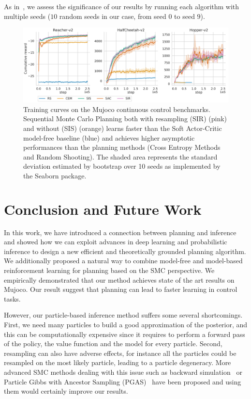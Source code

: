 As in~\citet{henderson2017deep}, we assess the significance of our results by running each algorithm with multiple seeds ($10$ random seeds in our case, from seed $0$ to seed $9$). %






\begin{figure}
\centering
\includegraphics[width=\linewidth]{articles/smcp/figures/finalplotsmcp.pdf}
\caption{
Training curves on the Mujoco continuous control benchmarks. Sequential Monte Carlo Planning both with resampling (SIR) (pink) and without (SIS) (orange) learns faster than the Soft Actor-Critic model-free baseline (blue) and achieves higher asymptotic performances than the planning methods (Cross Entropy Methods and Random Shooting). The shaded area represents the standard deviation estimated by bootstrap over 10 seeds as implemented by the Seaborn package.  %
}
\label{fig:reward_new}
\end{figure}









\section{Conclusion and Future Work}
In this work, we have introduced a connection between planning and inference and showed how we can exploit advances in deep learning and probabilistic inference to design a new efficient and theoretically grounded planning algorithm. 
We additionally proposed a natural way to combine model-free and model-based reinforcement learning for planning based on the SMC perspective.
We empirically demonstrated that our method achieves state of the art results on Mujoco. Our result suggest that planning can lead to faster learning in control tasks.

However, our particle-based inference method suffers some several shortcomings. First, we need many particles to build a good approximation of the posterior, and this can be computationally expensive since it requires to perform a forward pass of the policy, the value function and the model for every particle. Second, resampling can also have adverse effects, for instance all the particles could be resampled on the most likely particle, leading to a particle degeneracy. More advanced SMC methods dealing with this issue such as backward simulation~\citep{lindsten2013backward} or Particle Gibbs with Ancestor Sampling (PGAS)~\citep{lindsten2014particle} have been proposed and using them would certainly improve our results.

